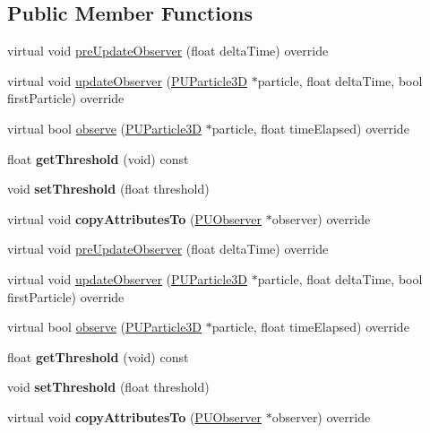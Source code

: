 \subsection*{Public Member Functions}
\begin{DoxyCompactItemize}
\item 
virtual void \hyperlink{classPUOnRandomObserver_af4d89ddfdab42970bd7595b1395bef8e}{pre\+Update\+Observer} (float delta\+Time) override
\item 
virtual void \hyperlink{classPUOnRandomObserver_ab187851f52f9a0aa125ed8f8799b1f75}{update\+Observer} (\hyperlink{structPUParticle3D}{P\+U\+Particle3D} $\ast$particle, float delta\+Time, bool first\+Particle) override
\item 
virtual bool \hyperlink{classPUOnRandomObserver_a788e7e6c809434acb224aa15183a9554}{observe} (\hyperlink{structPUParticle3D}{P\+U\+Particle3D} $\ast$particle, float time\+Elapsed) override
\item 
\mbox{\label{classPUOnRandomObserver_a6023940fba05e2c026b21db14744b31b}} 
float {\bfseries get\+Threshold} (void) const
\item 
\mbox{\label{classPUOnRandomObserver_a400c6982fd6db9254973b9b8d45b04bf}} 
void {\bfseries set\+Threshold} (float threshold)
\item 
\mbox{\label{classPUOnRandomObserver_a59c6c4b1e59e28e3c94c5d4d8bfa7193}} 
virtual void {\bfseries copy\+Attributes\+To} (\hyperlink{classPUObserver}{P\+U\+Observer} $\ast$observer) override
\item 
virtual void \hyperlink{classPUOnRandomObserver_a4396d7126702dcd8a4e789131e9c3efe}{pre\+Update\+Observer} (float delta\+Time) override
\item 
virtual void \hyperlink{classPUOnRandomObserver_a273c5e6fe5152c025c098a51f4df6b63}{update\+Observer} (\hyperlink{structPUParticle3D}{P\+U\+Particle3D} $\ast$particle, float delta\+Time, bool first\+Particle) override
\item 
virtual bool \hyperlink{classPUOnRandomObserver_a00961e9d122d4343ddf9b63c8c0dd720}{observe} (\hyperlink{structPUParticle3D}{P\+U\+Particle3D} $\ast$particle, float time\+Elapsed) override
\item 
\mbox{\label{classPUOnRandomObserver_a6023940fba05e2c026b21db14744b31b}} 
float {\bfseries get\+Threshold} (void) const
\item 
\mbox{\label{classPUOnRandomObserver_a400c6982fd6db9254973b9b8d45b04bf}} 
void {\bfseries set\+Threshold} (float threshold)
\item 
\mbox{\label{classPUOnRandomObserver_a1a6f01598e8154382184bb358ac8f818}} 
virtual void {\bfseries copy\+Attributes\+To} (\hyperlink{classPUObserver}{P\+U\+Observer} $\ast$observer) override
\end{DoxyCompactItemize}
